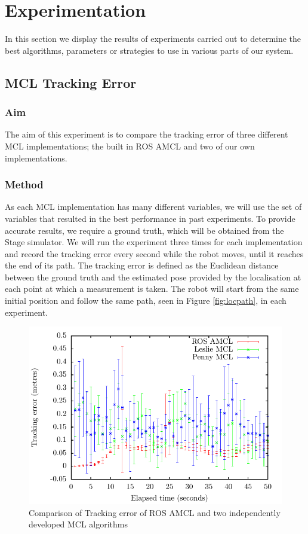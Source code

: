 \documentclass[conference]{IEEEtran}
\begin{document}
\section{Experimentation}
In this section we display the results of experiments carried out to determine the best algorithms, parameters or strategies to use in various parts of our system.
\subsection{MCL Tracking Error}

\subsubsection{Aim}
The aim of this experiment is to compare the tracking error of three different MCL implementations; the built in ROS AMCL and two of our own implementations.
\subsubsection{Method}
As each MCL implementation has many different variables, we will use the set of variables that resulted in the best performance in past experiments. To provide accurate results, we require a ground truth, which will be obtained from the Stage simulator. We will run the experiment three times for each implementation and record the tracking error every second while the robot moves, until it reaches the end of its path. The tracking error is defined as the Euclidean distance between the ground truth and the estimated pose provided by the localisation at each point at which a measurement is taken. The robot will start from the same initial position and follow the same path, seen in Figure \ref{fig:locpath}, in each experiment.
\begin{figure}[h]
  \includegraphics[width=\columnwidth]{tracking_stdev}
  \caption{Comparison of Tracking error of ROS AMCL and two independently developed MCL algorithms}
  \label{fig:local}
\end{figure}
\end{document}
